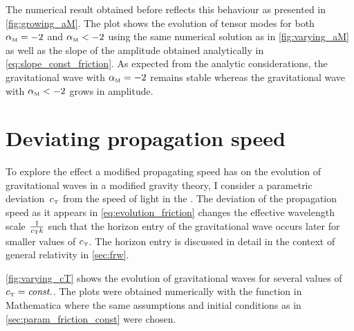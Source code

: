 \documentclass[12pt,parskip=half]{scrreprt}
\begin{document}
The numerical result obtained before reflects this behaviour as presented in \autoref{fig:growing_aM}. The plot shows the evolution of tensor modes for both \({\alpha_{\textnormal{\tiny{M}}}} = -2\) and \({\alpha_{\textnormal{\tiny{M}}}} < -2\) using the same numerical solution as in \autoref{fig:varying_aM} as well as the slope of the amplitude obtained analytically in \eqref{eq:slope_const_friction}. As expected from the analytic considerations, the gravitational wave with \({\alpha_{\textnormal{\tiny{M}}}} = -2\) remains stable whereas the gravitational wave with \({\alpha_{\textnormal{\tiny{M}}}} < -2\) grows in amplitude.



\section{Deviating propagation speed}

To explore the effect a modified propagating speed has on the evolution of gravitational waves in a modified gravity theory, I consider a parametric deviation~\({c_{\textnormal{\tiny{T}}}}\) from the speed of light in the . The deviation of the propagation speed as it appears in \eqref{eq:evolution_friction} changes the effective wavelength scale \(\frac{1}{{c_{\textnormal{\tiny{T}}}} k}\) such that the horizon entry of the gravitational wave occurs later for smaller values of \({c_{\textnormal{\tiny{T}}}}\). The horizon entry is discussed in detail in the context of general relativity in \autoref{sec:frw}.

\autoref{fig:varying_cT} shows the evolution of gravitational waves for several values of \({c_{\textnormal{\tiny{T}}}}=\textnormal{\textit{const.}}\). The plots were obtained numerically with the  function in Mathematica where the same assumptions and initial conditions as in \autoref{sec:param_friction_const} were chosen.

\end{document}
